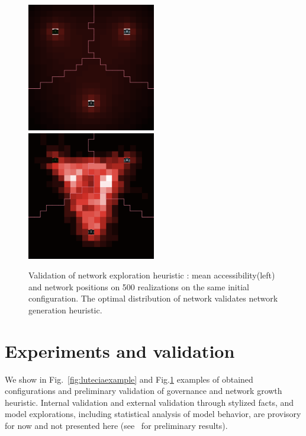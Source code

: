 \begin{figure}
\includegraphics[width=0.5\textwidth]{figures/_MEAN_ACC}
\includegraphics[width=0.5\textwidth]{figures/_NW_FREQ}
\caption[Validation of network exploration heuristic]{Validation of network exploration heuristic : mean accessibility(left) and network positions on 500 realizations on the same initial configuration. The optimal distribution of network validates network generation heuristic.}
\label{fig:luteciavalid}
\end{figure}








\section{Experiments and validation}


We show in Fig.~\ref{fig:luteciaexample} and Fig.\ref{fig:luteciavalid} examples of obtained configurations and preliminary validation of governance and network growth heuristic. Internal validation and external validation through stylized facts, and model explorations, including statistical analysis of model behavior, are provisory for now and not presented here (see~\cite{le2015modeling} for preliminary results).







